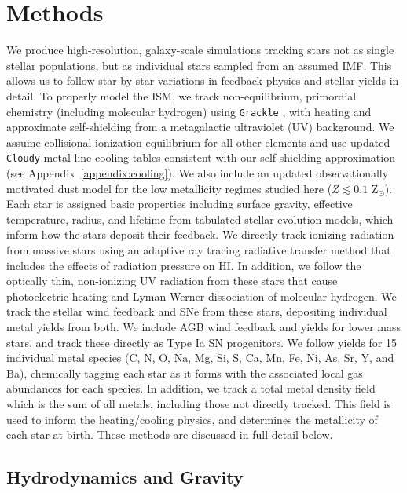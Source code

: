\section{Methods}
\label{ch1:sec:methods}
We produce high-resolution, galaxy-scale simulations tracking stars not as single stellar populations, but as individual stars sampled from an assumed IMF.
This allows us to follow star-by-star variations in feedback physics and stellar yields in detail. To properly model the ISM, we track non-equilibrium, primordial chemistry (including molecular hydrogen) using \texttt{Grackle} \citep{GrackleMethod}, with heating and approximate self-shielding from a metagalactic ultraviolet (UV) background. We assume collisional ionization equilibrium for all other elements and use updated \texttt{Cloudy} metal-line cooling tables consistent with our self-shielding approximation (see Appendix~\ref{appendix:cooling}). We also include an updated observationally motivated dust model for the low metallicity regimes studied here ($Z \lesssim 0.1$ Z$_{\odot}$). Each star is assigned basic properties including surface gravity, effective temperature, radius, and lifetime from tabulated stellar evolution models, which inform how the stars deposit their feedback. We directly track ionizing radiation from massive stars using an adaptive ray tracing radiative transfer method that includes the effects of radiation pressure on HI. In addition, we follow the optically thin, non-ionizing UV radiation from these stars that cause photoelectric heating and Lyman-Werner dissociation of molecular hydrogen. We track the stellar wind feedback and SNe from these stars, depositing individual metal yields from both. We include AGB wind feedback and yields for lower mass stars, and track these directly as Type Ia SN progenitors. We follow yields for 15 individual metal species (C, N, O, Na, Mg, Si, S, Ca, Mn, Fe, Ni, As, Sr, Y, and Ba), chemically tagging each star as it forms with the associated local gas abundances for each species. In addition, we track a total metal density field which is the sum of all metals, including those not directly tracked. This field is used to inform the heating/cooling physics, and determines the metallicity of each star at birth. These methods are discussed in full detail below.

\subsection{Hydrodynamics and Gravity}
\label{ch1:sec:hydro}

